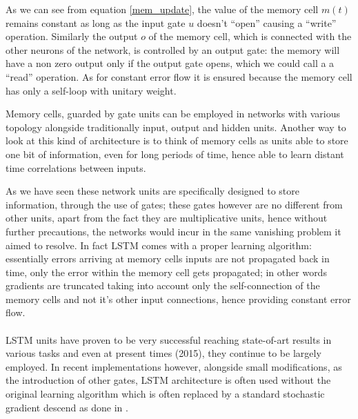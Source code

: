 As we can see from equation \ref{mem_update}, the value of the memory cell $m(t)$ remains constant as long as the input 
gate $u$ doesn't ``open'' causing a ``write'' operation. Similarly the output $o$ of the memory cell, which is 
connected with 
the other neurons of the network, is controlled by an output gate: the memory will have a non zero output only if the 
output gate opens, which we could call a  a ``read'' operation. As for constant error flow it is ensured because the 
memory cell has only a self-loop with unitary weight.

Memory cells, guarded by gate units can be employed in networks with various topology alongside traditionally 
input, output and hidden units. Another way to look at this kind of architecture is to think of memory cells as units 
able to store one bit of information, even for long periods of time, hence able to learn distant time correlations 
between inputs.

As we have seen these network units are specifically designed to store information, through the use of gates; these 
gates however are no different from other units, apart from the fact they are multiplicative units, hence without 
further precautions, the networks would incur in the same vanishing problem it aimed to resolve. In fact LSTM comes with 
a proper learning algorithm: essentially errors arriving at memory cells inputs are not propagated back in time, only 
the error within the memory cell gets propagated; in other words gradients are truncated taking into account only the 
self-connection of the memory cells and not it's other input connections, hence providing constant error flow.
\\\\
LSTM units have proven to be very successful reaching state-of-art results in various tasks and even at present times 
(2015), they continue to be largely
employed. In recent implementations however, alongside small modifications, as the introduction of other gates, LSTM 
architecture is often used without the original learning algorithm which is often replaced by a standard stochastic 
gradient descend as done in \cite{lstmGraves}.








